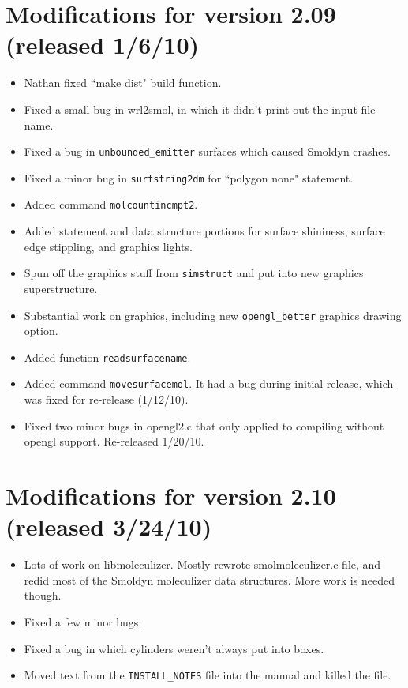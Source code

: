 \documentclass {scrbook}
\newcommand {\ttt} {\texttt}
\begin{document}
\section{Modifications for version 2.09 (released 1/6/10)}
\begin{itemize}
\item Nathan fixed ``make dist" build function.
\item Fixed a small bug in wrl2smol, in which it didn't print out the input file name.
\item Fixed a bug in \ttt{unbounded\_emitter} surfaces which caused Smoldyn crashes.
\item Fixed a minor bug in \ttt{surfstring2dm} for ``polygon none" statement.
\item Added command \ttt{molcountincmpt2}.
\item Added statement and data structure portions for surface shininess, surface edge stippling, and graphics lights.
\item Spun off the graphics stuff from \ttt{simstruct} and put into new graphics superstructure.
\item Substantial work on graphics, including new \ttt{opengl\_better} graphics drawing option.
\item Added function \ttt{readsurfacename}.
\item Added command \ttt{movesurfacemol}. It had a bug during initial release, which was fixed for re-release (1/12/10).
\item Fixed two minor bugs in opengl2.c that only applied to compiling without opengl support. Re-released 1/20/10.
\end{itemize}

\section{Modifications for version 2.10 (released 3/24/10)}
\begin{itemize}
\item Lots of work on libmoleculizer. Mostly rewrote smolmoleculizer.c file, and redid most of the Smoldyn moleculizer data structures. More work is needed though.
\item Fixed a few minor bugs.
\item Fixed a bug in which cylinders weren't always put into boxes.
\item Moved text from the \ttt{INSTALL\_NOTES} file into the manual and killed the file.
\end{itemize}
\end{document}
